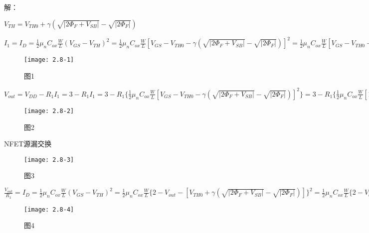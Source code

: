 

解：

\scalebox{3}{（a）}

$V_{TH}=V_{TH0}+\gamma(\sqrt{|2\Phi_F+V_{SB}|}-\sqrt{|2\Phi_F|})$

$I_1=I_D=\frac{1}{2}\mu_nC_{ox}\frac{W}{L}(V_{GS}-V_{TH})^2=\frac{1}{2}\mu_nC_{ox}\frac{W}{L}[V_{GS}-V_{TH0}-\gamma(\sqrt{|2\Phi_F+V_{SB}|}-\sqrt{|2\Phi_F|})]^2=\frac{1}{2}\mu_nC_{ox}\frac{W}{L}[V_{GS}-V_{TH0}-\gamma(\sqrt{|2\Phi_F+V_{DD}-V_{out}-V_{in}|}-\sqrt{|2\Phi_F|})]^2$

		\begin{figure}[H] %
	\begin{minipage}{\linewidth}
		\texttt{[image: 2.8-1]}
	\end{minipage}
	\caption*{图1} %
\end{figure}

\scalebox{3}{（b）}

$V_{out}=V_{DD}-R_1I_1=3-R_1I_1=3-R_1\{\frac{1}{2}\mu_nC_{ox}\frac{W}{L}[V_{GS}-V_{TH0}-\gamma(\sqrt{|2\Phi_F+V_{SB}|}-\sqrt{|2\Phi_F|})]^2\}=3-R_1\{\frac{1}{2}\mu_nC_{ox}\frac{W}{L}[1-0.7-0.45(\sqrt{|0.9+1-V_{in}|}-\sqrt{|0.9|})]^2\}=3-R_1\{\frac{1}{2}\mu_nC_{ox}\frac{W}{L}[0.3-0.45(\sqrt{1.9-V_{in}}-\sqrt{0.9})]^2\}$

		\begin{figure}[H] %
	\begin{minipage}{\linewidth}
		\texttt{[image: 2.8-2]}
	\end{minipage}
	\caption*{图2} %
\end{figure}

\scalebox{3}{（c）}

NFET源漏交换

		\begin{figure}[H] %
	\begin{minipage}{\linewidth}
		\texttt{[image: 2.8-3]}
	\end{minipage}
	\caption*{图3} %
\end{figure}

$\frac{V_{out}}{R_1}=I_D=\frac{1}{2}\mu_nC_{ox}\frac{W}{L}(V_{GS}-V_{TH})^2=\frac{1}{2}\mu_nC_{ox}\frac{W}{L}\{2-V_{out}-[V_{TH0}+\gamma(\sqrt{|2\Phi_F+V_{SB}|}-\sqrt{|2\Phi_F|})]\}^2=\frac{1}{2}\mu_nC_{ox}\frac{W}{L}\{2-V_{out}-[0.7+0.45(\sqrt{|0.9+V_{out}-V_{in}|}-\sqrt{|0.9|})]\}^2$

		\begin{figure}[H] %
	\begin{minipage}{\linewidth}
		\texttt{[image: 2.8-4]}
	\end{minipage}
	\caption*{图4} %
\end{figure}